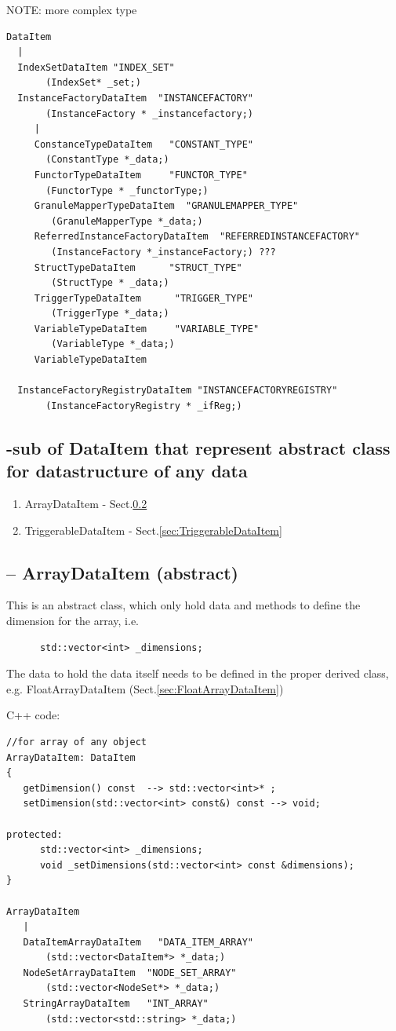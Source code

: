 NOTE: more complex type 
\begin{verbatim}      
DataItem
  |
  IndexSetDataItem "INDEX_SET"
       (IndexSet* _set;)        
  InstanceFactoryDataItem  "INSTANCEFACTORY"
       (InstanceFactory * _instancefactory;)
     |
     ConstanceTypeDataItem   "CONSTANT_TYPE"
       (ConstantType *_data;)
     FunctorTypeDataItem     "FUNCTOR_TYPE"
       (FunctorType * _functorType;)
     GranuleMapperTypeDataItem  "GRANULEMAPPER_TYPE"
        (GranuleMapperType *_data;)
     ReferredInstanceFactoryDataItem  "REFERREDINSTANCEFACTORY"
        (InstanceFactory *_instanceFactory;) ???
     StructTypeDataItem      "STRUCT_TYPE"
        (StructType * _data;)
     TriggerTypeDataItem      "TRIGGER_TYPE"
        (TriggerType *_data;)
     VariableTypeDataItem     "VARIABLE_TYPE"
        (VariableType *_data;)
     VariableTypeDataItem
     
  InstanceFactoryRegistryDataItem "INSTANCEFACTORYREGISTRY"
       (InstanceFactoryRegistry * _ifReg;)
\end{verbatim}

\subsection{-sub of DataItem that represent abstract class for datastructure of
any data}

\begin{enumerate}
  \item ArrayDataItem - Sect.\ref{sec:ArrayDataItem}
  \item TriggerableDataItem - Sect.\ref{sec:TriggerableDataItem}
\end{enumerate}

\subsection{-- ArrayDataItem (abstract)}
\label{sec:ArrayDataItem}

This is an abstract class, which only hold data and methods to define
the dimension for the array, i.e. 
\begin{verbatim}
      std::vector<int> _dimensions;
\end{verbatim}
The data to hold the data itself needs to be defined in the proper derived
class, e.g. FloatArrayDataItem (Sect.\ref{sec:FloatArrayDataItem})

C++ code:
\begin{verbatim}
//for array of any object
ArrayDataItem: DataItem
{
   getDimension() const  --> std::vector<int>* ;
   setDimension(std::vector<int> const&) const --> void;
   
protected:
      std::vector<int> _dimensions;
      void _setDimensions(std::vector<int> const &dimensions);
}

ArrayDataItem
   | 
   DataItemArrayDataItem   "DATA_ITEM_ARRAY"
       (std::vector<DataItem*> *_data;)
   NodeSetArrayDataItem  "NODE_SET_ARRAY"
       (std::vector<NodeSet*> *_data;)
   StringArrayDataItem   "INT_ARRAY"
       (std::vector<std::string> *_data;)
\end{verbatim}

